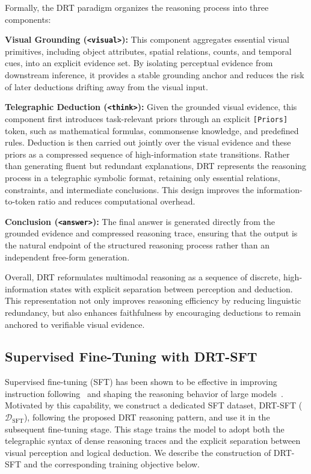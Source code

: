 Formally, the DRT paradigm organizes the reasoning process into three components:

\noindent\textbf{Visual Grounding (\texttt{<visual>}):}
This component aggregates essential visual primitives, including object attributes, spatial relations, counts, and temporal cues, into an explicit evidence set. By isolating perceptual evidence from downstream inference, it provides a stable grounding anchor and reduces the risk of later deductions drifting away from the visual input.

\noindent\textbf{Telegraphic Deduction (\texttt{<think>}):}
Given the grounded visual evidence, this component first introduces task-relevant priors through an explicit \texttt{[Priors]} token, such as mathematical formulas, commonsense knowledge, and predefined rules. Deduction is then carried out jointly over the visual evidence and these priors as a compressed sequence of high-information state transitions. Rather than generating fluent but redundant explanations, DRT represents the reasoning process in a telegraphic symbolic format, retaining only essential relations, constraints, and intermediate conclusions. This design improves the information-to-token ratio and reduces computational overhead.

\noindent\textbf{Conclusion (\texttt{<answer>}):}
The final answer is generated directly from the grounded evidence and compressed reasoning trace, ensuring that the output is the natural endpoint of the structured reasoning process rather than an independent free-form generation.

Overall, DRT reformulates multimodal reasoning as a sequence of discrete, high-information states with explicit separation between perception and deduction. This representation not only improves reasoning efficiency by reducing linguistic redundancy, but also enhances faithfulness by encouraging deductions to remain anchored to verifiable visual evidence.

\subsection{Supervised Fine-Tuning with DRT-SFT}\label{sft}
Supervised fine-tuning (SFT) has been shown to be effective in improving instruction following~\cite{ouyang2022training,wang2023self} and shaping the reasoning behavior of large models~\cite{huang2025vision,xia2025tokenskip,jiang2025drp}. Motivated by this capability, we construct a dedicated SFT dataset, DRT-SFT ($\mathcal{D}_{\text{SFT}}$), following the proposed DRT reasoning pattern, and use it in the subsequent fine-tuning stage. This stage trains the model to adopt both the telegraphic syntax of dense reasoning traces and the explicit separation between visual perception and logical deduction. We describe the construction of DRT-SFT and the corresponding training objective below.

